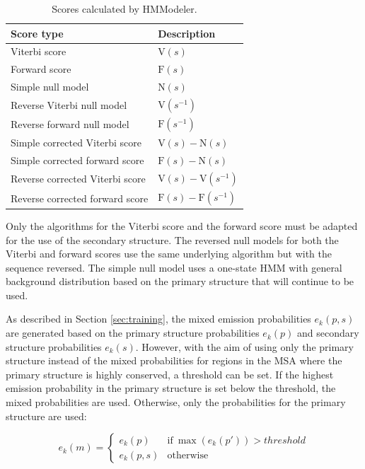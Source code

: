 \begin{table}[h!]
\centering
\begin{tabular}{|l|l|}
\hline
Score type					& Description\\ \hline
Viterbi score                    & $\text{V}(s)$                         \\ 
Forward score                    & $\text{F}(s)$                         \\ 
Simple null model                & $\text{N}(s)$                         \\ 
Reverse Viterbi null model       & $\text{V}(s^{-1})$      \\ 
Reverse forward null model       & $\text{F}(s^{-1})$      \\ 
Simple corrected Viterbi score   & $\text{V}(s)-\text{N}(s)$                    \\ 
Simple corrected forward score   & $\text{F}(s)-\text{N}(s)$                    \\ 
Reverse corrected  Viterbi score & $\text{V}(s)-\text{V}(s^{-1})$ \\ 
Reverse corrected forward score \qquad & $\text{F}(s)-\text{F}(s^{-1})$   \qquad \\  \hline
\end{tabular}
\caption{Scores calculated by HMModeler.}
\label{tab:Hmscores}
\end{table}

Only the algorithms for the Viterbi score and the forward score must be adapted for the use of the secondary structure. The reversed null models for both the Viterbi and forward scores use the same underlying algorithm but with the sequence reversed. The simple null model uses a one-state \ac{HMM} with general background distribution based on the primary structure that  will continue to be used.


As described in Section \ref{sec:training}, the mixed emission probabilities $e_k(p,s)$ are generated based on the primary structure probabilities $e_k(p)$ and secondary structure probabilities $e_k(s)$. However, with the aim of using only the primary structure instead of the mixed probabilities for regions in the \ac{MSA} where the primary structure is highly conserved, a threshold can be set. If the highest emission probability in the primary structure is set below the threshold, the mixed probabilities are used. Otherwise, only the probabilities for the primary structure are used: 

\begin{equation}
e_k(m) =
  \begin{cases}
    e_k(p)  &  \text{if}\: \max(e_k(p')) > threshold \\
    e_k(p,s) & \text{otherwise}
  \end{cases}
  \label{eq:weighting}
\end{equation}

